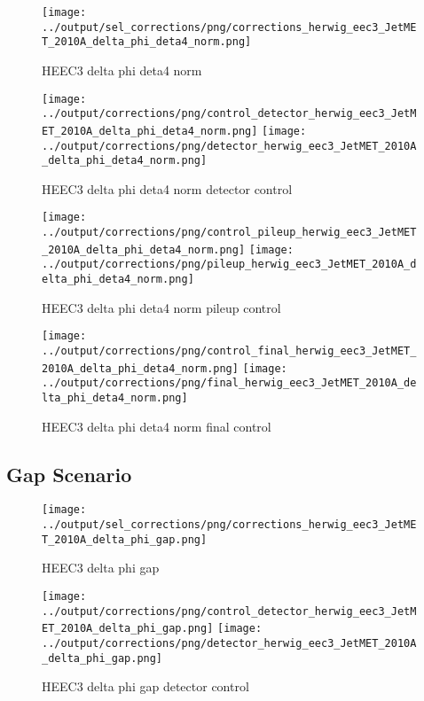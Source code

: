 \documentclass[11pt]{book}
\begin{document}
\begin{figure}[ht]
\centering
\texttt{[image: ../output/sel\_corrections/png/corrections\_herwig\_eec3\_JetMET\_2010A\_delta\_phi\_deta4\_norm.png]}
\caption{HEEC3 delta phi deta4 norm}
\label{fig:HEEC3_JetMET_2010A_delta_phi_deta4_norm}
\end{figure}

\begin{figure}[ht]
\centering
\texttt{[image: ../output/corrections/png/control\_detector\_herwig\_eec3\_JetMET\_2010A\_delta\_phi\_deta4\_norm.png]}
\texttt{[image: ../output/corrections/png/detector\_herwig\_eec3\_JetMET\_2010A\_delta\_phi\_deta4\_norm.png]}
\caption{HEEC3 delta phi deta4 norm detector control}
\label{fig:HEEC3_JetMET_2010A_delta_phi_deta4_norm_detector_control}
\end{figure}

\begin{figure}[ht]
\centering
\texttt{[image: ../output/corrections/png/control\_pileup\_herwig\_eec3\_JetMET\_2010A\_delta\_phi\_deta4\_norm.png]}
\texttt{[image: ../output/corrections/png/pileup\_herwig\_eec3\_JetMET\_2010A\_delta\_phi\_deta4\_norm.png]}
\caption{HEEC3 delta phi deta4 norm pileup control}
\label{fig:HEEC3_JetMET_2010A_delta_phi_deta4_norm_pileup_control}
\end{figure}


\begin{figure}[ht]
\centering
\texttt{[image: ../output/corrections/png/control\_final\_herwig\_eec3\_JetMET\_2010A\_delta\_phi\_deta4\_norm.png]}
\texttt{[image: ../output/corrections/png/final\_herwig\_eec3\_JetMET\_2010A\_delta\_phi\_deta4\_norm.png]}
\caption{HEEC3 delta phi deta4 norm final control}
\label{fig:HEEC3_JetMET_2010A_delta_phi_deta4_norm_final_control}
\end{figure}

\clearpage
\subsection{Gap Scenario}

\begin{figure}[ht]
\centering
\texttt{[image: ../output/sel\_corrections/png/corrections\_herwig\_eec3\_JetMET\_2010A\_delta\_phi\_gap.png]}
\caption{HEEC3 delta phi gap}
\label{fig:HEEC3_JetMET_2010A_delta_phi_gap}
\end{figure}


\begin{figure}[ht]
\centering
\texttt{[image: ../output/corrections/png/control\_detector\_herwig\_eec3\_JetMET\_2010A\_delta\_phi\_gap.png]}
\texttt{[image: ../output/corrections/png/detector\_herwig\_eec3\_JetMET\_2010A\_delta\_phi\_gap.png]}
\caption{HEEC3 delta phi gap detector control}
\label{fig:HEEC3_JetMET_2010A_delta_phi_gap_detector_control}
\end{figure}
\end{document}
